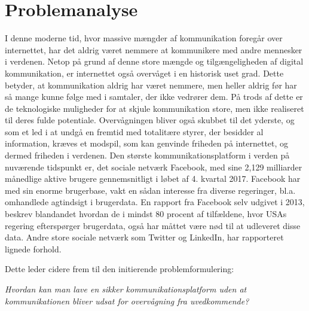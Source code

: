 \section{Problemanalyse}
I denne moderne tid, hvor massive mængder af kommunikation foregår over internettet, har det aldrig været nemmere at kommunikere med andre mennesker i verdenen. Netop på grund af denne store mængde og tilgængeligheden af digital kommunikation, er internettet også overvåget i en historisk uset grad. Dette betyder, at kommunikation aldrig har været nemmere, men heller aldrig før har så mange kunne følge med i samtaler, der ikke vedrører dem.\cite{Adgang_PersonligeData} På trods af dette er de teknologiske muligheder for at skjule kommunikation store, men ikke realiseret til deres fulde potentiale. Overvågningen bliver også skubbet til det yderste, og som et led i at undgå en fremtid med totalitære styrer, der besidder al information, kræves et modspil, som kan genvinde friheden på internettet, og dermed friheden i verdenen. 
Den største kommunikationsplatform i verden på nuværende tidspunkt er, det sociale netværk Facebook, med sine 2,129 milliarder månedlige aktive brugere gennemsnitligt i løbet af 4. kvartal 2017.\cite{FacebookStat} Facebook har med sin enorme brugerbase, vakt en sådan interesse fra diverse regeringer, bl.a. omhandlede agtindsigt i brugerdata. En rapport fra Facebook selv udgivet i 2013, beskrev blandandet hvordan de i mindst 80 procent af tilfældene, hvor USAs regering efterspørger brugerdata, også har måttet være nød til at udleveret disse data.\cite{PolitikenFacebook} Andre store sociale netværk som Twitter og LinkedIn, har rapporteret lignede forhold.\cite{PolitikenFacebook}

Dette leder cidere frem til den initierende problemformulering:
\begin{mdframed}[linewidth=0pt,backgroundcolor=lightgray!20,innertopmargin = 0.2cm,innerbottommargin = 0.2cm]
    \textit{Hvordan kan man lave en sikker kommunikationsplatform uden at kommunikationen bliver udsat for overvågning fra uvedkommende?}
\end{mdframed}

\newpage

\newpage

\newpage
